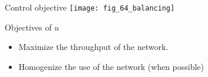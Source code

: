 \begin{frame}{Control objective}
    \texttt{[image: fig\_64\_balancing]}
    \begin{block}{Objectives of $u$}
    \begin{itemize}
      \item Maximize the throughput of the network.
      \item Homogenize the use of the network (when possible)
    \end{itemize}
    \end{block}
\end{frame}